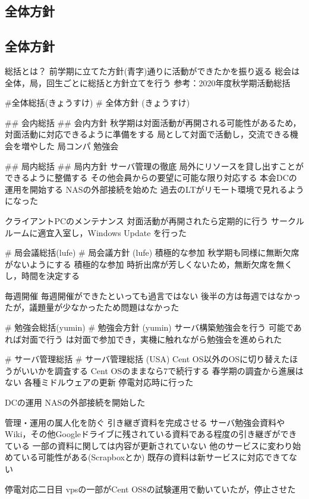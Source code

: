 \subsection*{全体方針}
\subsection*{全体方針}

総括とは？
前学期に立てた方針(青字)通りに活動ができたかを振り返る
総会は全体，局，回生ごとに総括と方針立てを行う
参考：2020年度秋学期活動総括

#全体総括(きょうすけ)
# 全体方針 (きょうすけ)

## 会内総括
## 会内方針
秋学期は対面活動が再開される可能性があるため，対面活動に対応できるように準備をする
局として対面で活動し，交流できる機会を増やした
局コンパ
勉強会

## 局内総括
## 局内方針
サーバ管理の徹底
局外にリソースを貸し出すことができるように整備する
その他会員からの要望に可能な限り対応する
本会DCの運用を開始する
NASの外部接続を始めた
過去のLTがリモート環境で見れるようになった


クライアントPCのメンテナンス
対面活動が再開されたら定期的に行う
サークルルームに適宜入室し，Windows Update を行った

# 局会議総括(lufe)
# 局会議方針 (lufe)
積極的な参加
秋学期も同様に無断欠席がないようにする
積極的な参加
時折出席が芳しくないため，無断欠席を無くし，時間を決定する

毎週開催
毎週開催ができたといっても過言ではない
後半の方は毎週ではなかったが，議題量が少なかったため問題はなかった

# 勉強会総括(yumin)
# 勉強会方針 (yumin)
サーバ構築勉強会を行う
可能であれば対面で行う
\firstGrade{}は対面で参加でき，実機に触れながら勉強会を進められた

# サーバ管理総括
# サーバ管理総括 (USA)
Cent OS以外のOSに切り替えたほうがいいかを調査する
Cent OSのままなら7で続行する
春学期の調査から進展はない
各種ミドルウェアの更新
停電対応時に行った

DCの運用
NASの外部接続を開始した

管理・運用の属人化を防ぐ
引き継ぎ資料を完成させる
サーバ勉強会資料やWiki，その他Googleドライブに残されている資料である程度の引き継ぎができている
一部の資料に関しては内容が更新されていない
他のサービスに変わり始めている可能性がある(Scrapboxとか)
既存の資料は新サービスに対応できてない

停電対応二日目
vpsの一部がCent OS8の試験運用で動いていたが，停止させた

